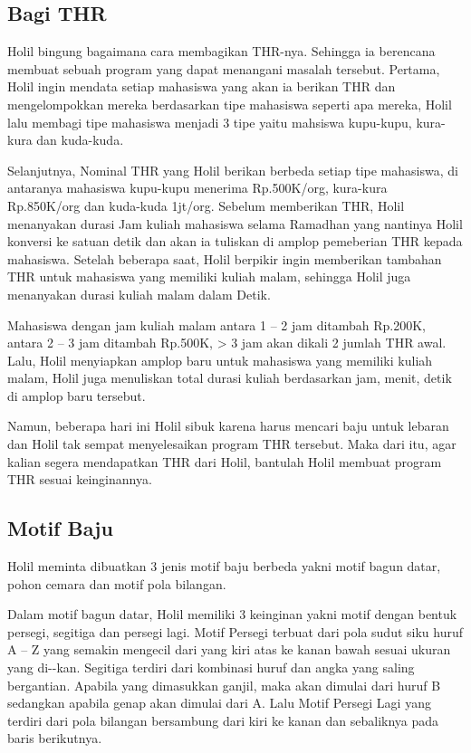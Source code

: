 \documentclass[../main.tex]{subfiles}
\begin{document}
    \subsection{Bagi THR}
    Holil bingung bagaimana cara membagikan THR-nya. Sehingga ia berencana membuat sebuah program yang dapat menangani masalah tersebut. Pertama, Holil ingin mendata setiap mahasiswa yang akan ia berikan THR dan mengelompokkan mereka berdasarkan tipe mahasiswa seperti apa mereka, Holil lalu membagi tipe mahasiswa menjadi 3 tipe yaitu mahsiswa kupu-kupu, kura-kura dan kuda-kuda.

    Selanjutnya, Nominal THR yang Holil berikan berbeda setiap tipe mahasiswa, di antaranya mahasiswa kupu-kupu menerima Rp.500K/org, kura-kura Rp.850K/org dan kuda-kuda 1jt/org. Sebelum memberikan THR, Holil menanyakan durasi Jam kuliah mahasiswa selama Ramadhan yang nantinya Holil konversi ke satuan detik dan akan ia tuliskan di amplop pemeberian THR kepada mahasiswa. Setelah beberapa saat, Holil berpikir ingin memberikan tambahan THR untuk mahasiswa yang memiliki kuliah malam, sehingga Holil juga menanyakan durasi kuliah malam dalam Detik.

    Mahasiswa dengan jam kuliah malam antara 1 – 2 jam ditambah Rp.200K, antara 2 – 3 jam ditambah Rp.500K, > 3 jam akan dikali 2 jumlah THR awal. Lalu, Holil menyiapkan amplop baru untuk mahasiswa yang memiliki kuliah malam, Holil juga menuliskan total durasi kuliah berdasarkan jam, menit, detik di amplop baru tersebut.

    Namun, beberapa hari ini Holil sibuk karena harus mencari baju untuk lebaran dan Holil tak sempat menyelesaikan program THR tersebut. Maka dari itu, agar kalian segera mendapatkan THR dari Holil, bantulah Holil membuat program THR sesuai keinginannya.

    \subsection{Motif Baju}
    Holil meminta dibuatkan 3 jenis motif baju berbeda yakni motif bagun datar, pohon cemara dan motif pola bilangan.

    Dalam motif bagun datar, Holil memiliki 3 keinginan yakni motif dengan bentuk persegi, segitiga dan persegi lagi. Motif Persegi terbuat dari pola sudut siku huruf A – Z yang semakin mengecil dari yang kiri atas ke kanan bawah sesuai ukuran yang di-{\ioi}-kan. Segitiga terdiri dari kombinasi huruf dan angka yang saling bergantian. Apabila {\ioi} yang dimasukkan ganjil, maka akan dimulai dari huruf B sedangkan apabila {\ioi} genap akan dimulai dari A. Lalu Motif Persegi Lagi yang terdiri dari pola bilangan bersambung dari kiri ke kanan dan sebaliknya pada baris berikutnya.
\end{document}
